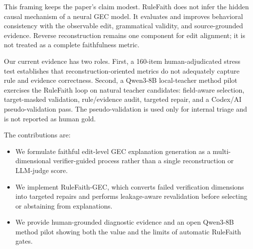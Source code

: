 This framing keeps the paper's claim modest. RuleFaith does not infer the hidden causal mechanism of a neural GEC model. It evaluates and improves behavioral consistency with the observable edit, grammatical validity, and source-grounded evidence. Reverse reconstruction remains one component for edit alignment; it is not treated as a complete faithfulness metric.

Our current evidence has two roles. First, a 160-item human-adjudicated stress test establishes that reconstruction-oriented metrics do not adequately capture rule and evidence correctness. Second, a Qwen3-8B local-teacher method pilot exercises the RuleFaith loop on natural teacher candidates: field-aware selection, target-masked validation, rule/evidence audit, targeted repair, and a Codex/AI pseudo-validation pass. The pseudo-validation is used only for internal triage and is not reported as human gold.

The contributions are:

\begin{itemize}
\item We formulate faithful edit-level GEC explanation generation as a multi-dimensional verifier-guided process rather than a single reconstruction or LLM-judge score.
\item We implement RuleFaith-GEC, which converts failed verification dimensions into targeted repairs and performs leakage-aware revalidation before selecting or abstaining from explanations.
\item We provide human-grounded diagnostic evidence and an open Qwen3-8B method pilot showing both the value and the limits of automatic RuleFaith gates.
\end{itemize}
